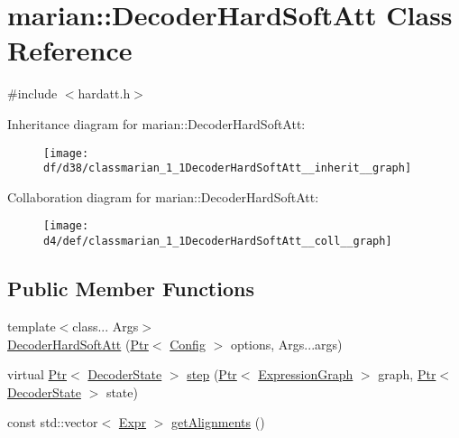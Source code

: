 \hypertarget{classmarian_1_1DecoderHardSoftAtt}{}\section{marian\+:\+:Decoder\+Hard\+Soft\+Att Class Reference}
\label{classmarian_1_1DecoderHardSoftAtt}


{\ttfamily \#include $<$hardatt.\+h$>$}



Inheritance diagram for marian\+:\+:Decoder\+Hard\+Soft\+Att\+:
\nopagebreak
\begin{figure}[H]
\begin{center}
\leavevmode
\texttt{[image: df/d38/classmarian\_1\_1DecoderHardSoftAtt\_\_inherit\_\_graph]}
\end{center}
\end{figure}


Collaboration diagram for marian\+:\+:Decoder\+Hard\+Soft\+Att\+:
\nopagebreak
\begin{figure}[H]
\begin{center}
\leavevmode
\texttt{[image: d4/def/classmarian\_1\_1DecoderHardSoftAtt\_\_coll\_\_graph]}
\end{center}
\end{figure}
\subsection*{Public Member Functions}
\begin{DoxyCompactItemize}
\item 
{\footnotesize template$<$class... Args$>$ }\\\hyperlink{classmarian_1_1DecoderHardSoftAtt_a4685d8ba22a7f5b083dd15a7957d97f6}{Decoder\+Hard\+Soft\+Att} (\hyperlink{namespacemarian_ad1a373be43a00ef9ce35666145137b08}{Ptr}$<$ \hyperlink{classmarian_1_1Config}{Config} $>$ options, Args...\+args)
\item 
virtual \hyperlink{namespacemarian_ad1a373be43a00ef9ce35666145137b08}{Ptr}$<$ \hyperlink{classmarian_1_1DecoderState}{Decoder\+State} $>$ \hyperlink{classmarian_1_1DecoderHardSoftAtt_aa3331fae45271298ce86ad6f6a5c9cf5}{step} (\hyperlink{namespacemarian_ad1a373be43a00ef9ce35666145137b08}{Ptr}$<$ \hyperlink{classmarian_1_1ExpressionGraph}{Expression\+Graph} $>$ graph, \hyperlink{namespacemarian_ad1a373be43a00ef9ce35666145137b08}{Ptr}$<$ \hyperlink{classmarian_1_1DecoderState}{Decoder\+State} $>$ state)
\item 
const std\+::vector$<$ \hyperlink{namespacemarian_a498d8baf75b754011078b890b39c8e12}{Expr} $>$ \hyperlink{classmarian_1_1DecoderHardSoftAtt_a39c270be364b3e37f3834f6fc867ac34}{get\+Alignments} ()
\end{DoxyCompactItemize}
